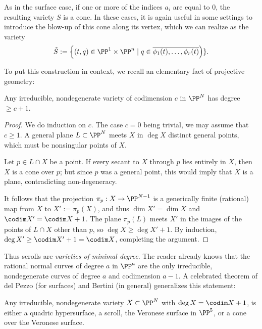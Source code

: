 As in the surface case, if one or more of the indices $a_i$ are equal to 0, the resulting variety $S$ is a cone. In these cases, it is again useful in some settings to introduce the blow-up of this cone along its vertex, which we can realize as the variety
$$
\tilde S := \left\{ (t, q) \in \PP^1 \times \PP^n  \mid q \in \overline{\phi_1(t), \dots, \phi_r(t)}\right)\}.
$$

To put this construction in context, we recall an elementary fact of projective geometry:
 
\begin{proposition}\label{minimal degree}
 Any irreducible, nondegenerate variety of codimension $c$ in $\PP^{N}$ has degree $\geq c +1$.
\end{proposition}

\begin{proof} We do induction on $c$. The case $c=0$ being trivial,
 we may assume that $c\geq1$. A general plane $L\subset \PP^{N}$ meets $X$ in $\deg X$
 distinct general points, which must be nonsingular points of $X$.
 
Let $p\in L\cap X$ be a point. If every secant to $X$ through $p$ lies entirely in $X$, then $X$ is a cone over $p$; but since $p$ was a general point, this would imply that $X$ is a plane, contradicting non-degeneracy. 

It follows that the projection $\pi_{p}:X \to \PP^{N-1}$ is a generically finite (rational) map from $X$ to $X' := \pi_{p}(X)$,
and thus $\dim X' = \dim X$ and $\codim X' = \codim X+1$. The plane 
$\pi_{p}(L)$ meets $X'$ in the images of the points of $L\cap X$ other than $p$, so
$\deg X\geq \deg X'+1$. By induction, $\deg X' \geq \codim X'+1 = \codim X$, completing the argument.
\end{proof}

Thus scrolls are \emph{varieties of minimal degree}. The reader already knows that the rational normal curves of degree $a$ in $\PP^{a}$ are the only irreducible, nondegenerate curves of degree $a$ and codimension $a-1$. A celebrated theorem of del Pezzo (for surfaces) and Bertini (in general) generalizes this statement:

\begin{fact}\label{classification of scrolls} 
Any irreducible, nondegenerate variety $X\subset \PP^{N}$  with $\deg X = \codim X+1$, is either a quadric hypersurface, a scroll, the Veronese surface in $\PP^{5}$, or a cone over the Veronese surface.
\end{fact}

